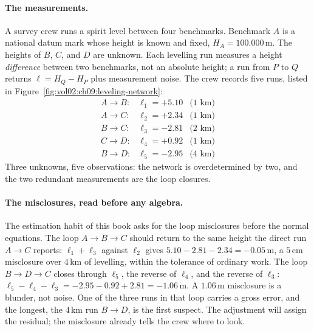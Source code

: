\paragraph{The measurements.}
A survey crew runs a spirit level between four benchmarks. Benchmark
$A$ is a national datum mark whose height is known and fixed,
$H_{A} = 100.000\,\si{\meter}$. The heights of $B$, $C$, and $D$ are
unknown. Each levelling run measures a height \emph{difference}
between two benchmarks, not an absolute height; a run from $P$ to $Q$
returns $\ell = H_{Q} - H_{P}$ plus measurement noise. The crew
records five runs, listed in Figure~\ref{fig:vol02:ch09:leveling-network}:
\[
\begin{array}{llr}
A \to B: & \ell_{1} = +5.10 & \text{(1 km)} \\
A \to C: & \ell_{2} = +2.34 & \text{(1 km)} \\
B \to C: & \ell_{3} = -2.81 & \text{(2 km)} \\
C \to D: & \ell_{4} = +0.92 & \text{(1 km)} \\
B \to D: & \ell_{5} = -2.95 & \text{(4 km)}
\end{array}
\]
Three unknowns, five observations: the network is overdetermined by
two, and the two redundant measurements are the loop closures.



\paragraph{The misclosures, read before any algebra.}
The estimation habit of this book asks for the loop misclosures
before the normal equations. The loop $A \to B \to C$ should return
to the same height the direct run $A \to C$ reports:
$\ell_{1} + \ell_{3}$ against $\ell_{2}$ gives $5.10 - 2.81 - 2.34
= -0.05\,\si{\meter}$, a $5\,\si{\centi\meter}$ misclosure over
$4\,\si{\kilo\meter}$ of levelling, within the tolerance of ordinary
work. The loop $B \to D \to C$ closes through $\ell_{5}$, the reverse
of $\ell_{4}$, and the reverse of $\ell_{3}$: $\ell_{5} - \ell_{4}
- \ell_{3} = -2.95 - 0.92 + 2.81 = -1.06\,\si{\meter}$. A
$1.06\,\si{\meter}$ misclosure is a blunder, not noise. One of the
three runs in that loop carries a gross error, and the longest, the
$4\,\si{\kilo\meter}$ run $B \to D$, is the first suspect. The
adjustment will assign the residual; the misclosure already tells the
crew where to look.

